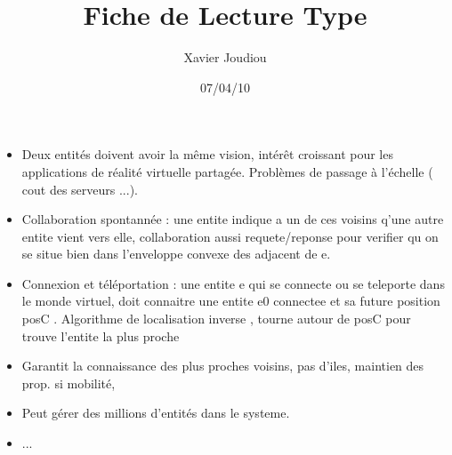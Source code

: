 \documentclass[11pt,a4paper]{article}
\title{Fiche de Lecture Type}
\author{Xavier Joudiou}
\date{07/04/10}
\begin{document}
	
  \begin{itemize}
  \renewcommand{\labelitemi}{$\Rightarrow$}
	\item Deux entités doivent avoir la même vision, intérêt croissant pour les applications de réalité virtuelle partagée. Problèmes de passage à l'échelle ( cout des serveurs ...).
	\item Collaboration spontannée : une entite indique a un de ces voisins q'une autre entite vient vers elle, collaboration aussi requete/reponse pour verifier qu on se situe bien dans l'enveloppe convexe des adjacent de e.
	\item Connexion et téléportation : une entite e qui se connecte ou se teleporte dans le monde virtuel, doit connaitre une entite e0 connectee et sa future position posC . Algorithme de localisation inverse , tourne autour de posC pour trouve l'entite la plus proche
	\item Garantit la connaissance des plus proches voisins, pas d'iles, maintien des prop. si mobilité,
	\item Peut gérer des millions d'entités dans le systeme.
	\item ...
  \end{itemize}
\end{document}
